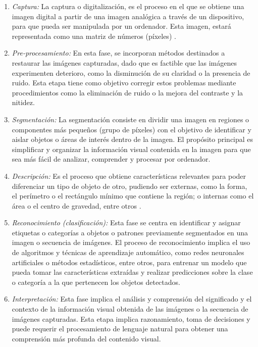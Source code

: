 \begin{enumerate}
 \item \textit{Captura:} La captura o digitalización, es el proceso en el que se obtiene una imagen digital a partir de una imagen analógica a través de un dispositivo, para que pueda ser manipulada por un ordenador. Esta imagen, estará representada como una matriz de números (píxeles) \cite{Martinez22}.
 
 \item \textit{Pre-procesamiento:} En esta fase, se incorporan métodos destinados a restaurar las imágenes capturadas, dado que es factible que las imágenes experimenten deterioro, como la disminución de su claridad o la presencia de ruido. Esta etapa tiene como objetivo corregir estos problemas mediante procedimientos como la eliminación de ruido o la mejora del contraste y la nitidez.
 
 \item \textit{Segmentación:} La segmentación consiste en dividir una imagen en regiones o componentes más pequeños (grupo de píxeles) con el objetivo de identificar y aislar objetos o áreas de interés dentro de la imagen. El propósito principal es simplificar y organizar la información visual contenida en la imagen para que sea más fácil de analizar, comprender y procesar por ordenador.

 \item \textit{Descripción:} Es el proceso que obtiene características relevantes para poder diferenciar un tipo de objeto de otro, pudiendo ser externas, como la forma, el perímetro o el rectángulo mínimo que contiene la región; o internas como el área o el centro de gravedad, entre otros \cite{Santillan15}. 
 
 \item \textit{Reconocimiento (clasificación):} Esta fase se centra en identificar y asignar etiquetas o categorías a objetos o patrones previamente segmentados en una imagen o secuencia de imágenes. El proceso de reconocimiento implica el uso de algoritmos y técnicas de aprendizaje automático, como redes neuronales artificiales o métodos estadísticos, entre otros, para entrenar un modelo que pueda tomar las características extraídas y realizar predicciones sobre la clase o categoría a la que pertenecen los objetos detectados.
 
 \item \textit{Interpretación:} Esta fase implica el análisis y comprensión del significado y el contexto de la información visual obtenida de las imágenes o la secuencia de imágenes capturadas. Esta etapa implica razonamiento, toma de decisiones y puede requerir el procesamiento de lenguaje natural para obtener una comprensión más profunda del contenido visual.
 
\end{enumerate}

